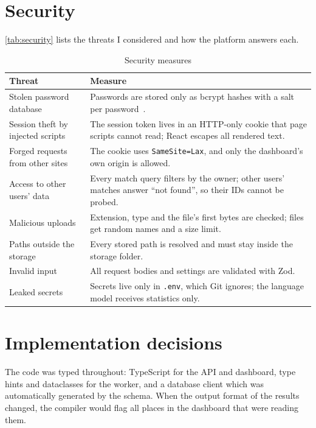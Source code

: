 \section{Security}

\autoref{tab:security} lists the threats I considered and how the platform answers each.

\begin{table}[H]
	\centering
	\begin{tabular}{|p{}|p{}|}
		\hline
		\textbf{Threat} & \textbf{Measure} \\
		\hline
		Stolen password database & Passwords are stored only as bcrypt hashes with a salt per password~\cite{owasp}. \\
		\hline
		Session theft by injected scripts & The session token lives in an HTTP-only cookie that page scripts cannot read; React escapes all rendered text. \\
		\hline
		Forged requests from other sites & The cookie uses \texttt{SameSite=Lax}, and only the dashboard's own origin is allowed. \\
		\hline
		Access to other users' data & Every match query filters by the owner; other users' matches answer ``not found'', so their IDs cannot be probed. \\
		\hline
		Malicious uploads & Extension, type and the file's first bytes are checked; files get random names and a size limit. \\
		\hline
		Paths outside the storage & Every stored path is resolved and must stay inside the storage folder. \\
		\hline
		Invalid input & All request bodies and settings are validated with Zod. \\
		\hline
		Leaked secrets & Secrets live only in \texttt{.env}, which Git ignores; the language model receives statistics only. \\
		\hline
	\end{tabular}
	\caption{Security measures}
	\label{tab:security}
\end{table}

\section{Implementation decisions}

The code was typed throughout: TypeScript for the API and dashboard, type hints and dataclasses for the worker, and a database client which was automatically generated by the schema. When the output format of the results changed, the compiler would flag all places in the dashboard that were reading them.

